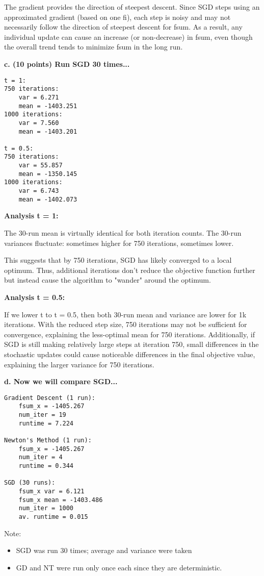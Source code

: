 \documentclass[a4paper,10pt]{article}
\theoremstyle{definition}
\begin{document}
The gradient provides the direction of steepest descent. Since SGD steps using 
an approximated gradient (based on one fi), each step is noisy and may not 
necessarily follow the direction of steepest descent for fsum. As a result, any 
individual update can cause an increase (or non-decrease) in fsum, even though 
the overall trend tends to minimize fsum in the long run.

\textbf{c. (10 points) Run SGD 30 times...}
\begin{verbatim}
t = 1:
750 iterations:
    var = 6.271
    mean = -1403.251
1000 iterations:
    var = 7.560
    mean = -1403.201

t = 0.5:
750 iterations:
    var = 55.857
    mean = -1350.145
1000 iterations:
    var = 6.743
    mean = -1402.073
\end{verbatim}

\textbf{Analysis t = 1:}

The 30-run mean is virtually identical for both iteration counts. The 30-run variances fluctuate: sometimes higher for 750 iterations, sometimes lower.

This suggests that by 750 iterations, SGD has likely converged to a local optimum.
Thus, additional iterations don't reduce the objective function further but instead cause the
algorithm to "wander" around the optimum.

\textbf{Analysis t = 0.5:}

If we lower t to t = 0.5, then both 30-run mean and variance are lower for
1k iterations. With the reduced step size, 750 iterations may not be sufficient for convergence,
explaining the less-optimal mean for 750 iterations. Additionally, if SGD is
still making relatively large steps at iteration 750, small differences in the stochastic
updates could cause noticeable differences in the final objective value, explaining
the larger variance for 750 iterations.

\textbf{d. Now we will compare SGD...}
\begin{verbatim}
Gradient Descent (1 run):
    fsum_x = -1405.267
    num_iter = 19
    runtime = 7.224

Newton's Method (1 run):
    fsum_x = -1405.267
    num_iter = 4
    runtime = 0.344

SGD (30 runs):
    fsum_x var = 6.121
    fsum_x mean = -1403.486
    num_iter = 1000
    av. runtime = 0.015
\end{verbatim}

Note:
\begin{itemize}
    \item SGD was run 30 times; average and variance were taken
    \item GD and NT were run only once each since they are deterministic.
\end{itemize}
\end{document}
